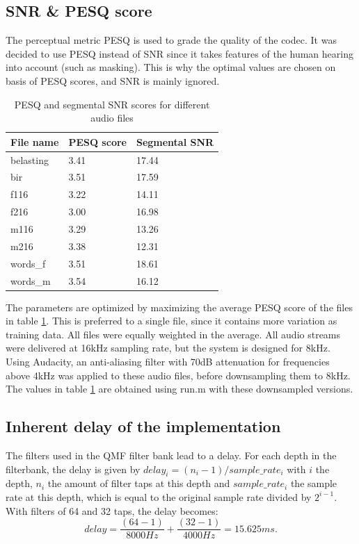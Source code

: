 \documentclass[a4paper]{article}
\begin{document}
\subsection{SNR \& PESQ score}
The perceptual metric PESQ is used to grade the quality of the codec. It was decided to use PESQ instead of SNR since it takes features of the human hearing into account (such as masking). This is why the optimal values are chosen on basis of PESQ scores, and SNR is mainly ignored.\\

\begin{table}[bth]
\begin{center}
\begin{tabular}{ l|ll }
  File name & PESQ score & Segmental SNR \\
  \hline
  belasting & 3.41 & 17.44\\
  bir & 3.51 & 17.59\\
  f116 & 3.22 & 14.11 \\
  f216 & 3.00 & 16.98\\
  m116 & 3.29 & 13.26\\
  m216 & 3.38 & 12.31\\
  words\_f & 3.51 & 18.61\\
  words\_m & 3.54 & 16.12\\
  \hline
\end{tabular}
  \caption{PESQ and segmental SNR scores for different audio files}
\label{tab:pesqscores}
\end{center}
\end{table}
The parameters are optimized by maximizing the average PESQ score of the files in table \ref{tab:pesqscores}. This is preferred to a single file, since it contains more variation as training data. All files were equally weighted in the average. All audio streams were delivered at 16kHz sampling rate, but the system is designed for 8kHz. Using Audacity, an anti-aliasing filter with 70dB attenuation for frequencies above 4kHz was applied to these audio files, before downsampling them to 8kHz. The values in table \ref{tab:pesqscores} are obtained using run.m with these downsampled versions.

\subsection{Inherent delay of the implementation}
The filters used in the QMF filter bank lead to a delay. For each depth in the filterbank, the delay is given by $delay_i = (n_i-1) / sample\_rate_i$ with $i$ the depth, $n_i$ the amount of filter taps at this depth and $sample\_rate_i$ the sample rate at this depth, which is equal to the original sample rate divided by $2^{i-1}$. With filters of 64 and 32 taps, the delay becomes:
\begin{equation*}
delay = \frac{(64-1)}{8000 Hz} + \frac{(32-1)}{4000 Hz} = 15.625 ms.
\end{equation*}
\end{document}
